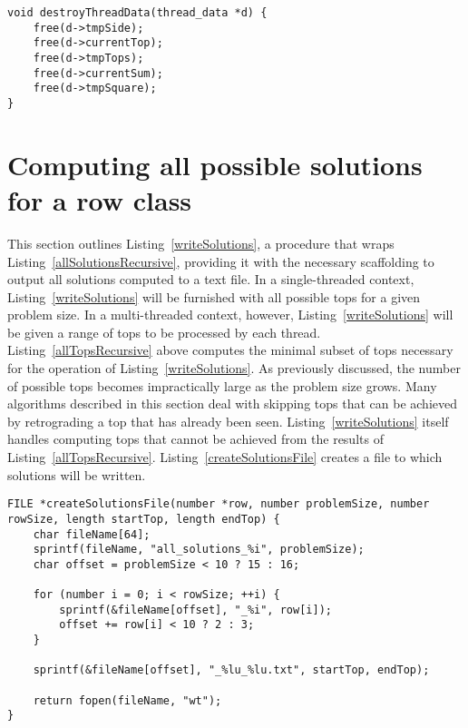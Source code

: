 \begin{lstlisting}[caption={Deallocating thread-specific data.},label={destroyThreadData}]
void destroyThreadData(thread_data *d) {
    free(d->tmpSide);
    free(d->currentTop);
    free(d->tmpTops);
    free(d->currentSum);
    free(d->tmpSquare);
}
\end{lstlisting}

\section{Computing all possible solutions for a row class}

This section outlines Listing~\ref{writeSolutions}, a procedure that wraps Listing~\ref{allSolutionsRecursive}, providing it with the necessary scaffolding to output all solutions computed to a text file. In a single-threaded context, Listing~\ref{writeSolutions} will be furnished with all possible tops for a given problem size. In a multi-threaded context, however, Listing~\ref{writeSolutions} will be given a range of tops to be processed by each thread. Listing~\ref{allTopsRecursive} above computes the minimal subset of tops necessary for the operation of Listing~\ref{writeSolutions}. As previously discussed, the number of possible tops becomes impractically large as the problem size grows. Many algorithms described in this section deal with skipping tops that can be achieved by retrograding a top that has already been seen. Listing~\ref{writeSolutions} itself handles computing tops that cannot be achieved from the results of Listing~\ref{allTopsRecursive}. Listing~\ref{createSolutionsFile} creates a file to which solutions will be written.

\begin{lstlisting}[caption={Creating a text file to hold all thread-specific solutions.},label={createSolutionsFile}]
FILE *createSolutionsFile(number *row, number problemSize, number rowSize, length startTop, length endTop) {
    char fileName[64];
    sprintf(fileName, "all_solutions_%i", problemSize);
    char offset = problemSize < 10 ? 15 : 16;

    for (number i = 0; i < rowSize; ++i) {
        sprintf(&fileName[offset], "_%i", row[i]);
        offset += row[i] < 10 ? 2 : 3;
    }

    sprintf(&fileName[offset], "_%lu_%lu.txt", startTop, endTop);

    return fopen(fileName, "wt");
}
\end{lstlisting}

